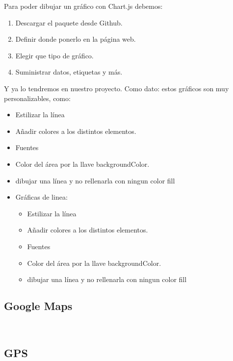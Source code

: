 \documentclass[a4paper, 11pt]{article}
\begin{document}
\begin{itemize}
          Para poder dibujar un gráfico con Chart.js debemos:
          \begin{enumerate}[1.]
            \item Descargar el paquete desde Github.
            \item Definir donde ponerlo en la página web.
            \item Elegir que tipo de gráfico.
            \item Suministrar datos, etiquetas y más.
          \end{enumerate}
          Y ya lo tendremos en nuestro proyecto. Como dato: estos gráficos son muy
          personalizables, como:

          \begin{itemize}
            \item{Estilizar la línea}
            \item{Añadir colores a los distintos elementos. }
            \item{Fuentes}
            \item{Color del área por la llave backgroundColor.}
            \item{dibujar una línea y no rellenarla con ningun color fill}
            \item{Gráficas de linea:}
              \begin{itemize}
                \item{Estilizar la línea}
                \item{Añadir colores a los distintos elementos. }
                \item{Fuentes}
                \item{Color del área por la llave backgroundColor.}
                \item{dibujar una línea y no rellenarla con ningun color fill}
              \end{itemize}
          \end{itemize}

        \subsection{Google Maps}\\

        \subsection{GPS}\\


\end{itemize}
\end{document}

